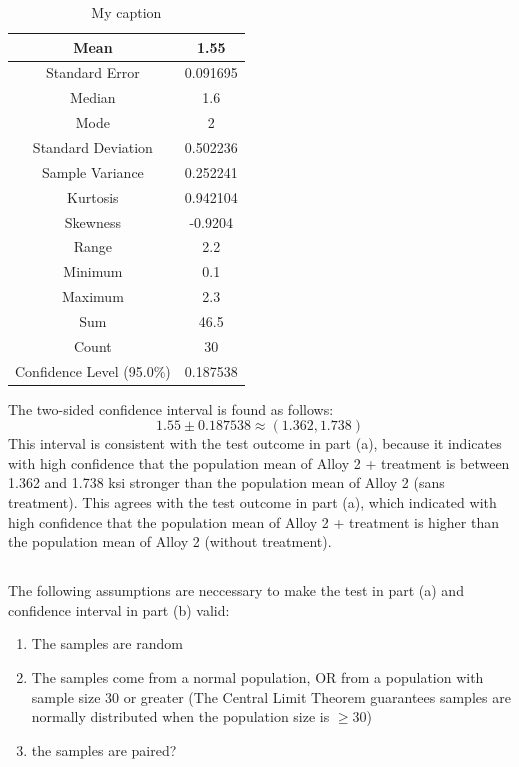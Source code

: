 \documentclass[letterpaper]{article}
\begin{document}
\begin{table}[H]
 \centering
 \begin{tabular}{|c|c|}
  \hline
  Mean                      & 1.55     \\ \hline
  Standard Error            & 0.091695 \\ \hline
  Median                    & 1.6      \\ \hline
  Mode                      & 2        \\ \hline
  Standard Deviation        & 0.502236 \\ \hline
  Sample Variance           & 0.252241 \\ \hline
  Kurtosis                  & 0.942104 \\ \hline
  Skewness                  & -0.9204  \\ \hline
  Range                     & 2.2      \\ \hline
  Minimum                   & 0.1      \\ \hline
  Maximum                   & 2.3      \\ \hline
  Sum                       & 46.5     \\ \hline
  Count                     & 30       \\ \hline
  Confidence Level (95.0\%) & 0.187538 \\ \hline
 \end{tabular}
 \caption{My caption}
 \label{my-label}
\end{table}

The two-sided confidence interval is found as follows:
$$1.55 \pm 0.187538 \approx (1.362, 1.738) $$
This interval is consistent with the test outcome in
part (a), because it indicates with high confidence that the population mean of
Alloy 2 + treatment is between 1.362 and 1.738 ksi stronger than the population
mean of Alloy 2 (sans treatment). This agrees with the test outcome in part (a),
which indicated with high confidence that the population mean of Alloy 2 +
treatment is higher than the population mean of Alloy 2 (without treatment).

\subsection{}%

The following assumptions are neccessary to make the test in part (a)
and confidence interval in part (b) valid:
\begin{enumerate}
 \item The samples are random
 \item The samples come from a normal population,
       OR from a population with sample size 30 or greater
       (The Central Limit Theorem guarantees samples are normally distributed
       when the population size is $\geq 30$)
 \item the samples are paired?
\end{enumerate}
\end{document}
